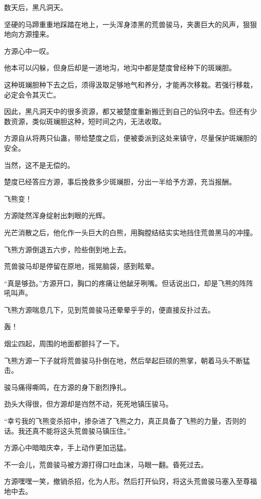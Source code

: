 
\begin{this_body}

数天后，黑凡洞天。

坚硬的马蹄重重地踩踏在地上，一头浑身漆黑的荒兽骏马，夹裹巨大的风声，狠狠地向方源撞来。

方源心中一叹。

他本可以闪躲，但身后却是一道地沟，地沟中都是楚度曾经种下的斑斓胆。

这种斑斓胆种下去之后，须得汲取足够地气和养分，才能再次移栽。若强行移栽，必定会令其灭亡。

因此，黑凡洞天中的很多资源，都又被楚度重新搬迁到自己的仙窍中去。但还有少数资源，类似斑斓胆这种，短时间之内，无法收取。

方源自从将两只仙蛊，带给楚度之后，便被委派到这处来镇守，尽量保护斑斓胆的安全。

当然，这不是无偿的。

楚度已经答应方源，事后挽救多少斑斓胆，分出一半给予方源，充当报酬。

飞熊变！

方源陡然浑身绽射出刺眼的光辉。

光芒消散之后，他化作一头巨大的白熊，用胸膛结结实实地挡住荒兽黑马的冲撞。

飞熊方源倒退五六步，险些倒到地上去。

荒兽骏马却是停留在原地，摇晃脑袋，感到眩晕。

“真是够劲。”方源开口，胸口的疼痛让他龇牙咧嘴。但话说出口，却是飞熊的阵阵吼叫声。

飞熊方源喘息几下，见到荒兽骏马还晕晕乎乎的，便直接反扑过去。

轰！

烟尘四起，周围的地面都颤抖了一下。

飞熊方源一下子就将荒兽骏马扑倒在地，然后举起巨硕的熊掌，朝着马头不断猛击。

骏马痛得嘶鸣，在方源的身下剧烈挣扎。

劲头大得很，但方源却是岿然不动，死死地镇压骏马。

“幸亏我的飞熊变杀招中，掺杂进了飞熊之力，真正具备了飞熊的力量，否则的话。我还真不能将这头荒兽骏马镇压住。”

方源心中暗暗庆幸，手上动作更加迅猛。

不一会儿，荒兽骏马被方源打得口吐血沫，马眼一翻。昏死过去。

方源嘿嘿一笑，撤销杀招，化为人形。然后打开仙窍，将这头荒兽骏马塞入至尊福地中去。


\end{this_body}
